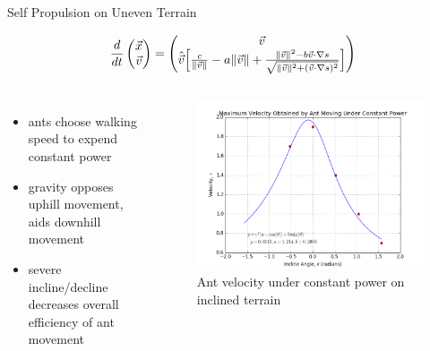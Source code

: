 \begin{frame}{Self 
Propulsion on Uneven Terrain}

\begin{align*}
\frac{d}{dt} \begin{pmatrix}\vec{x}\\\vec{v}\end{pmatrix} = \begin{pmatrix}\vec{v}\\ \hat{\vec{v}} \Big[ \frac{c}{\lVert\vec{v}\rVert} - a \lVert\vec{v}\rVert + \frac{\lVert\vec{v}\rVert^2 - b \vec{v} \cdot \nabla s}{\sqrt{\lVert\vec{v}\rVert^2 + (\vec{v} \cdot \nabla s)^2}} \Big] \end{pmatrix}
\end{align*}

\begin{columns}[T,onlytextwidth]

\small{
\begin{itemize}
    \item ants choose walking speed to expend constant power {\scriptsize\cite{holt_locomotion_2012}}
    \item gravity opposes uphill movement, aids downhill movement
    \item severe incline/decline decreases overall efficiency of ant movement
\end{itemize}
}
 \begin{figure}
    	\includegraphics[width=\textwidth]{images/const_power_velocity}
        \caption{Ant velocity under constant power on inclined terrain}
    \end{figure}
\end{columns}
\end{frame}


